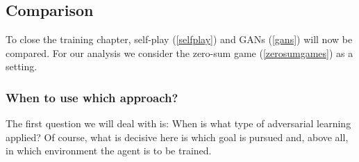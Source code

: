  \subsection{Comparison}
\label{adv_comparison}
 
 \begin{comment}
 
- vergleichen, wie es sich nach jeder trainingsrunde verhält: bei self-play wird der bessere genommen - bei GANs muss zb diskriminator "warten" ? 
 
 - algorithmen vergleichen - entscheidung, update, 
 
 - homogenes gameplay bei Go: beide agents haben gleiche aufgabe.
 
 - heterogenes gmaeplay bei GANs: Spieler verfolgen genau entgegengesetzte Ziele.
 
 
 - GANs sind wohl der allgemeinere Fall - aber warum sollte man dann Self-Play verwenden?
- Bietet ein Ansatz (theoretische) Garantieen, die ein anderer Ansatz nicht hat? (Garantie, dass der Gegner immer gleich gut ist beim self-play zb) 
- Was ist effizienter und leichter zu implementieren? 
- Gibt es Beispiele für Agentensysteme oder praktische Anwendungsfälle, in denen das eine mehr Sinn macht als das andere (abgesehen vom offensichtlichen Fall homogen vs. heterogen).
 
 
\end{comment} 
 
 
 To close the training chapter, self-play (\ref{selfplay}) and GANs (\ref{gans}) will now be compared.
 For our analysis we consider the zero-sum game (\ref{zerosumgames}) as a setting. 


\subsubsection{When to use which approach?}

The first question we will deal with is: When is what type of adversarial learning applied?
Of course, what is decisive here is which goal is pursued and, above all, in which environment the agent is to be trained.\\

